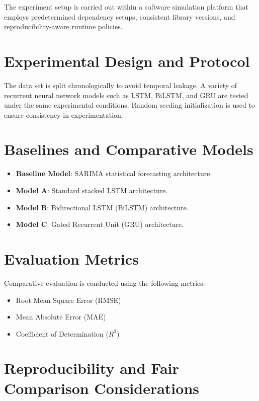 \documentclass[12pt]{report}
\begin{document}
The experiment setup is carried out within a software simulation platform that employs predetermined dependency setups, consistent library versions, and reproducibility-aware runtime policies.


\section{Experimental Design and Protocol}

The data set is split chronologically to avoid temporal leakage. A variety of recurrent neural network models such as LSTM, BiLSTM, and GRU are tested under the same experimental conditions. Random seeding initialization is used to ensure consistency in experimentation.


\section{Baselines and Comparative Models}

\begin{itemize}
    \item \textbf{Baseline Model}: SARIMA statistical forecasting architecture.
    
    \item \textbf{Model A}: Standard stacked LSTM architecture.
    
    \item \textbf{Model B}: Bidirectional LSTM (BiLSTM) architecture.
    
    \item \textbf{Model C}: Gated Recurrent Unit (GRU) architecture.
\end{itemize}

\section{Evaluation Metrics}

Comparative evaluation is conducted using the following metrics:

\begin{itemize}
    \item Root Mean Square Error (RMSE)
    
    \item Mean Absolute Error (MAE)
    
    \item Coefficient of Determination ($R^2$)
\end{itemize}

\section{Reproducibility and Fair Comparison Considerations}
\end{document}
